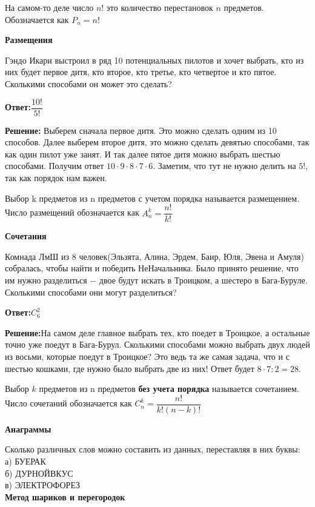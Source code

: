 На самом-то деле число $n!$ это количество перестановок $n$ предметов. Обозначается как $P_n = n!$

\textbf{\large Размещения}

Гэндо Икари выстроил в ряд 10 потенциальных пилотов и хочет выбрать, кто из них будет первое дитя, кто второе, кто третье, кто четвертое и кто пятое. Сколькими способами он может это сделать?

\textbf{Ответ:$\dfrac{10!}{5!}$}

\textbf{Решение:} Выберем сначала первое дитя. Это можно сделать одним из 10 способов. Далее выберем второе дитя, это можно сделать девятью способами, так как один пилот уже занят. И так далее пятое дитя можно выбрать шестью способами. Получим ответ $10 \cdot 9 \cdot 8 \cdot 7 \cdot 6$. Заметим, что тут не нужно делить на $5!$, так как порядок нам важен.

Выбор k предметов из n предметов с учетом порядка называется размещением. Число размещений обозначается как $A_n^k = \dfrac{n!}{k!}$ 

\textbf{\large Сочетания}

 Комнада ЛмШ из 8 человек(Эльзята, Алина, Эрдем, Баир, Юля, Эвена и Амуля) собралась, чтобы найти и победить НеНачальника. Было принято решение, что им нужно разделиться $-$ двое будут искать в Троицком, а шестеро в Бага-Буруле. Сколькими способами они могут разделиться?

\textbf{Ответ:$C_6^2$}

\textbf{Решение:}На самом деле главное выбрать тех, кто поедет в Троицкое, а остальные точно уже поедут в Бага-Бурул. Сколькими способами можно выбрать двух людей 
\newpage
из восьми, которые поедут в Троицкое? Это ведь та же самая задача, что и с шестью кошками, где нужно было выбрать две из них! Ответ будет $8\cdot 7 :2  =28$. 

Выбор $k$ предметов из n предметов \textbf{без учета порядка} называется сочетанием. Число сочетаний обозначается как $C_n^k = \dfrac{n!}{k!(n-k)!}$

\textbf{\Large Анаграммы}

Сколько различных слов можно составить из данных, переставляя в них буквы:\\
а) БУЕРАК\\
б) ДУРНОЙВКУС\\
в) ЭЛЕКТРОФОРЕЗ\\

\textbf{\Large Метод шариков и перегородок}

